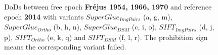 \begin{figure}[htbp]
\begin{center}
		\caption{{\scriptsize \ac{DoD}s between free epoch \textbf{Fr{\'e}jus 1954, 1966, 1970} and reference epoch \textbf{2014} with variants $SuperGlue_{ImgPairs}$ (a, g, m), $SuperGlue_{Ortho}$ (b, h, n), $SuperGlue_{DSM}$ (c, i, o), $SIFT_{ImgPairs}$ (d, j, p), $SIFT_{Ortho}$ (e, k, q) and $SIFT_{DSM}$ (f, l, r). The prohibition sign means the corresponding variant failed.}}
		\label{DoDFrejus}
	\end{center}
\end{figure} 

